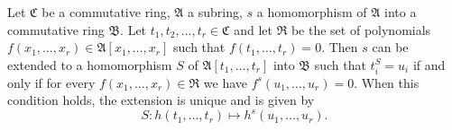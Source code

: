 Let $\mathfrak{C}$ be a commutative ring, $\mathfrak{A}$ a subring, $s$ a homomorphism of $\mathfrak{A}$ into a commutative ring $\mathfrak{B}$. Let $t_1, t_2, \ldots, t_r \in \mathfrak{C}$ and let $\mathfrak{R}$ be the set of polynomials $f(x_1, \ldots, x_r) \in \mathfrak{A}[x_1, \ldots, x_r]$ such that $f(t_1, \ldots, t_r) = 0$. Then $s$ can be extended to a homomorphism $S$ of $\mathfrak{A}[t_1, \ldots, t_r]$ into $\mathfrak{B}$ such that $t_i^S = u_i$ if and only if for every $f(x_1, \ldots, x_r) \in \mathfrak{R}$ we have $f^s(u_1, \ldots, u_r) = 0$. When this condition holds, the extension is unique and is given by
$$S: h(t_1, \ldots, t_r) \mapsto h^s(u_1, \ldots, u_r).$$
